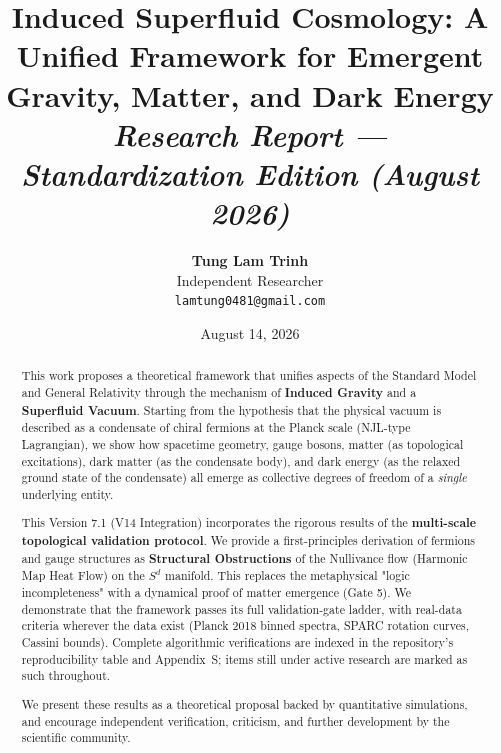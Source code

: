 \documentclass[a4paper,12pt]{article}
\title{\textbf{Induced Superfluid Cosmology: A Unified Framework for Emergent Gravity, Matter, and Dark Energy}\\ \large \textit{Research Report --- Standardization Edition (August 2026)}}
\author{\textbf{Tung Lam Trinh} \\ Independent Researcher \\ \texttt{lamtung0481@gmail.com}}
\date{August 14, 2026}
\begin{document}
\maketitle

\begin{abstract}
This work proposes a theoretical framework that unifies aspects of the Standard Model and General Relativity through the mechanism of \textbf{Induced Gravity} and a \textbf{Superfluid Vacuum}. Starting from the hypothesis that the physical vacuum is described as a condensate of chiral fermions at the Planck scale (NJL-type Lagrangian), we show how spacetime geometry, gauge bosons, matter (as topological excitations), dark matter (as the condensate body), and dark energy (as the relaxed ground state of the condensate) all emerge as collective degrees of freedom of a \textit{single} underlying entity.

This Version 7.1 (V14 Integration) incorporates the rigorous results of the \textbf{multi-scale topological validation protocol}. We provide a first-principles derivation of fermions and gauge structures as \textbf{Structural Obstructions} of the Nullivance flow (Harmonic Map Heat Flow) on the $S^d$ manifold. This replaces the metaphysical "logic incompleteness" with a dynamical proof of matter emergence (Gate 5). We demonstrate that the framework passes its full validation-gate ladder, with real-data criteria wherever the data exist (Planck 2018 binned spectra, SPARC rotation curves, Cassini bounds). Complete algorithmic verifications are indexed in the repository's reproducibility table and Appendix~S; items still under active research are marked as such throughout.

We present these results as a theoretical proposal backed by quantitative simulations, and encourage independent verification, criticism, and further development by the scientific community.


\end{abstract}
\end{document}
